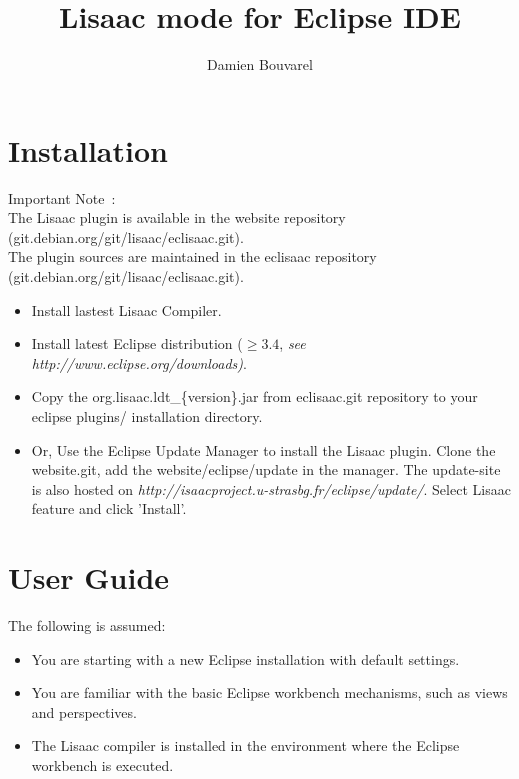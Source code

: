 \documentclass{article}
\title{Lisaac mode for Eclipse IDE}
\author{Damien Bouvarel}
\begin{document}
\maketitle


\section{Installation}
%

{\sc{}Important Note~:}\\
The Lisaac plugin is available in the website repository (git.debian.org/git/lisaac/eclisaac.git).\\
The plugin sources are maintained in the eclisaac repository (git.debian.org/git/lisaac/eclisaac.git).\\

\begin{itemize}
\item{Install lastest Lisaac Compiler.}
\item{Install latest Eclipse distribution ($\geq 3.4$, {\it{}see http://www.eclipse.org/downloads)}}.
\item{Copy the org.lisaac.ldt\_\{version\}.jar from eclisaac.git repository to your eclipse plugins/ installation directory.}
\item{Or, Use the Eclipse Update Manager to install the Lisaac plugin.  Clone the website.git, add the website/eclipse/update in the manager. The update-site is also hosted on {\it{}http://isaacproject.u-strasbg.fr/eclipse/update/}. Select Lisaac feature and click 'Install'.}\\
\end{itemize}

\section{User Guide}
%

The following is assumed:
\begin{itemize}
\item{You are starting with a new Eclipse installation with default settings.}
\item{You are familiar with the basic Eclipse workbench mechanisms, such as views and perspectives.}
\item{The Lisaac compiler is installed in the environment where the Eclipse workbench is executed.}
\end{itemize}
\end{document}
